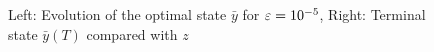 \begin{figure}[htb]
\centering
\subfloat{}\quad
\subfloat{}
\caption{Left: Evolution of the optimal state $\bar y$ for $\varepsilon = 10^{-5}$, Right: Terminal state $\bar y(T)$ compared with $z$}
\label{ex2fullgammadm5}
\end{figure}




